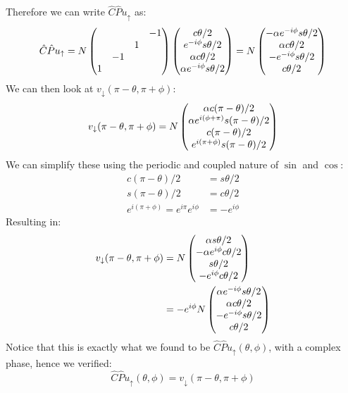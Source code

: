 \documentclass[12pt]{article}
\begin{document}
Therefore we can write $\hat{C}\hat{P}u_\uparrow$ as:
\begin{align*}
  \hat{C}\hat{P}u_\uparrow=N\pmqty{&&&-1\\&&1&\\&-1&&\\1&&&}
  \pmqty{c\theta/2\\e^{-i\phi}s\theta/2\\
    \alpha c\theta/2\\\alpha e^{-i\phi} s\theta/2}=
  N\pmqty{-\alpha e^{-i\phi}s\theta/2\\\alpha c\theta/2\\
    -e^{-i\phi}s\theta/2\\c\theta/2}
\end{align*}
We can then look at $v_\downarrow(\pi-\theta,\pi+\phi)$:
\begin{align*}
  v_\downarrow(\pi-\theta,\pi+\phi)=N
  \pmqty{\alpha c(\pi-\theta)/2\\\alpha e^{i(\phi+\pi)}s(\pi-\theta)/2\\
    c(\pi-\theta)/2\\ e^{i(\pi+\phi)} s(\pi-\theta)/2}
\end{align*}
We can simplify these using the periodic and coupled nature of $\sin$ and $\cos$:
\begin{align*}
  c(\pi-\theta)/2&=s\theta/2\\
  s(\pi-\theta)/2&=c\theta/2\\
  e^{i(\pi+\phi)}=e^{i\pi}e^{i\phi}&=-e^{i\phi}
\end{align*}
Resulting in:
\begin{align*}
  v_\downarrow(\pi-\theta,\pi+\phi)&=N
  \pmqty{\alpha s\theta/2\\-\alpha e^{i\phi}c\theta/2\\
    s\theta/2\\ -e^{i\phi} c\theta/2}\\
  &=-e^{i\phi}N\pmqty{\alpha e^{-i\phi}s\theta/2\\\alpha c\theta/2\\
    -e^{-i\phi}s\theta/2\\ c\theta/2}
\end{align*}
Notice that this is exactly what we found to be $\hat{C}\hat{P}u_\uparrow(\theta,\phi)$, with a complex phase, hence we verified:
\begin{equation}
  \label{eq:p6}
  \boxed{
    \hat{C}\hat{P}u_{\uparrow}(\theta,\phi)=v_{\downarrow}(\pi-\theta,\pi+\phi)}
\end{equation}
\newpage
\end{document}
